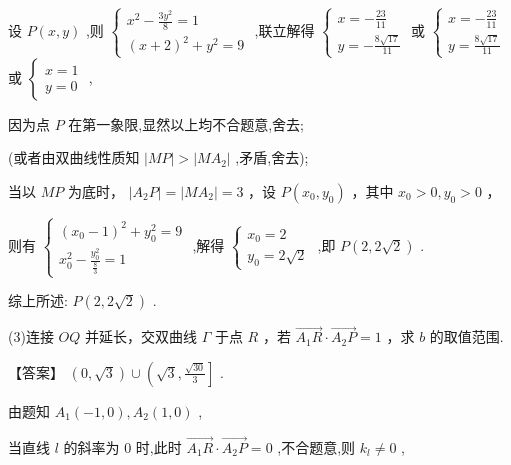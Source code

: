 \documentclass[10pt]{article}
\newcommand*\circled[1]{\tikz[baseline=(char.base)]{\node[shape=circle,draw,inner sep=1.5pt] (char) {\small #1};}}
\begin{document}
设 \(P\left( {x,y}\right)\) ,则 \(\left\{  \begin{array}{l} {x}^{2} - \frac{3{y}^{2}}{8} = 1 \\  {\left( x + 2\right) }^{2} + {y}^{2} = 9 \end{array}\right.\) ,联立解得 \(\left\{  \begin{array}{l} x =  - \frac{23}{11} \\  y =  - \frac{8\sqrt{17}}{11} \end{array}\right.\) 或 \(\left\{  \begin{array}{l} x =  - \frac{23}{11} \\  y = \frac{8\sqrt{17}}{11} \end{array}\right.\) 或 \(\left\{  \begin{array}{l} x = 1 \\  y = 0 \end{array}\right.\) ,

因为点 \(P\) 在第一象限,显然以上均不合题意,舍去;

(或者由双曲线性质知 \(\left| {MP}\right|  > \left| {M{A}_{2}}\right|\) ,矛盾,舍去);

 \circled{3}  当以 \({MP}\) 为底时， \(\left| {{A}_{2}P}\right|  = \left| {M{A}_{2}}\right|  = 3\) ，设 \(P\left( {{x}_{0},{y}_{0}}\right)\) ，其中 \({x}_{0} > 0,{y}_{0} > 0\) ，

则有 \(\left\{  \begin{array}{l} {\left( {x}_{0} - 1\right) }^{2} + {y}_{0}^{2} = 9 \\  {x}_{0}^{2} - \frac{{y}_{0}^{2}}{\frac{8}{3}} = 1 \end{array}\right.\) ,解得 \(\left\{  \begin{array}{l} {x}_{0} = 2 \\  {y}_{0} = 2\sqrt{2} \end{array}\right.\) ,即 \(P\left( {2,2\sqrt{2}}\right)\) .

综上所述: \(P\left( {2,2\sqrt{2}}\right)\) .

(3)连接 \({OQ}\) 并延长，交双曲线 \(\Gamma\) 于点 \(R\) ，若 \(\overrightarrow{{A}_{1}R} \cdot  \overrightarrow{{A}_{2}P} = 1\) ，求 \(b\) 的取值范围.

【答案】 \(\left( {0,\sqrt{3}}\right)  \cup  \left( {\sqrt{3},\frac{\sqrt{30}}{3}}\right\rbrack\) .

由题知 \({A}_{1}\left( {-1,0}\right) ,{A}_{2}\left( {1,0}\right)\) ,

当直线 \(l\) 的斜率为 0 时,此时 \(\overrightarrow{{A}_{1}R} \cdot  \overrightarrow{{A}_{2}P} = 0\) ,不合题意,则 \({k}_{l} \neq  0\) ,
\end{document}
